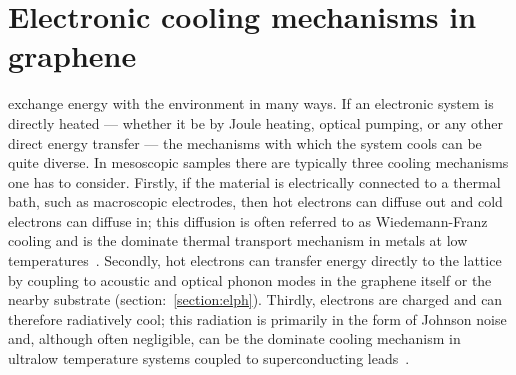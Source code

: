 
\chapter{Electronic cooling mechanisms in graphene}
\label{ch:electronic_cooling}
 exchange energy with the environment in many ways. If an electronic system is directly heated --- whether it be by Joule heating, optical pumping, or any other direct energy transfer --- the mechanisms with which the system cools can be quite diverse. In mesoscopic samples there are typically three cooling mechanisms one has to consider. Firstly, if the material is electrically connected to a thermal bath, such as macroscopic electrodes, then hot electrons can diffuse out and cold electrons can diffuse in; this diffusion is often referred to as Wiedemann-Franz cooling and is the dominate thermal transport mechanism in metals at low temperatures~\cite{ashcroft_solid_1976}. Secondly, hot electrons can transfer energy directly to the lattice by coupling to acoustic and optical phonon modes in the graphene itself or the nearby substrate (section:~\ref{section:elph}). Thirdly, electrons are charged and can therefore radiatively cool; this radiation is primarily in the form of Johnson noise and, although often negligible, can be the dominate cooling mechanism in ultralow temperature systems coupled to superconducting leads~\cite{mckitterick_performance_2013, mckitterick_electron-phonon_2016}.

